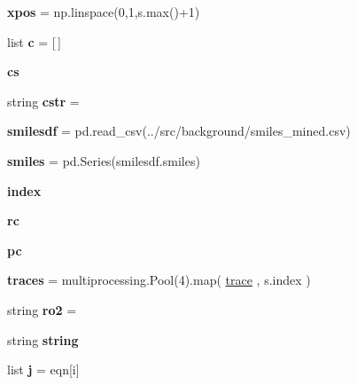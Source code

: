 \begin{DoxyCompactItemize}
{\bfseries xpos} = np.\+linspace(0,1,s.\+max()+1)
\item 
\mbox{\label{namespaceMCM__subset_aa0d5c24be611f92f741c574ec74092d7}} 
list {\bfseries c} = \mbox{[}$\,$\mbox{]}
\item 
\mbox{\label{namespaceMCM__subset_aed6f97877daf659771b9369deb970ec0}} 
{\bfseries cs}
\item 
\mbox{\label{namespaceMCM__subset_aec627d291df0ce2a9a590d3a60527883}} 
string {\bfseries cstr} = \textquotesingle{}\textquotesingle{}
\item 
\mbox{\label{namespaceMCM__subset_ad9c0ca5a64b92f1f9de4472686162cab}} 
{\bfseries smilesdf} = pd.\+read\+\_\+csv(\textquotesingle{}../src/background/smiles\+\_\+mined.\+csv\textquotesingle{})
\item 
\mbox{\label{namespaceMCM__subset_a69e64e266b6dd22fe8c11efa9e5afa01}} 
{\bfseries smiles} = pd.\+Series(smilesdf.\+smiles)
\item 
\mbox{\label{namespaceMCM__subset_aa3fc9fbc3d3b6b7ff73ca4a831719f08}} 
{\bfseries index}
\item 
\mbox{\label{namespaceMCM__subset_a715fe81032d9085dca4fb80f7868fd96}} 
{\bfseries rc}
\item 
\mbox{\label{namespaceMCM__subset_a046e70b979190d9b3b14e7016395c517}} 
{\bfseries pc}
\item 
\mbox{\label{namespaceMCM__subset_aa401d02f03df2a0f53d7bc0f36b235a2}} 
{\bfseries traces} = multiprocessing.\+Pool(4).map( \mbox{\hyperlink{namespaceMCM__subset_a4b3a88b2d7b093981b698e0227194e3f}{trace}} , s.\+index )
\item 
\mbox{\label{namespaceMCM__subset_a740d9ab5aa88b39b9e4768626146c1d4}} 
string {\bfseries ro2} = \textquotesingle{}\textquotesingle{}
\item 
string {\bfseries string}
\item 
\mbox{\label{namespaceMCM__subset_a975d648c533dac12986d0daab06af4c0}} 
list {\bfseries j} = eqn\mbox{[}i\mbox{]}
\end{DoxyCompactItemize}


